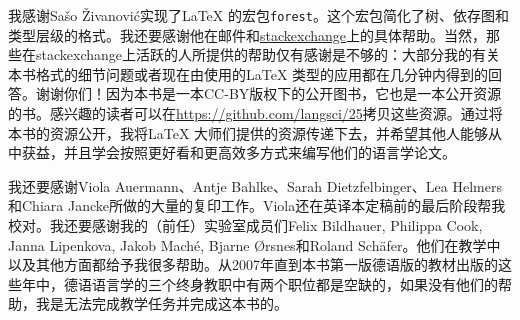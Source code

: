 我感谢Sašo Živanović实现了\LaTeX{} 的宏包\texttt{forest}。这个宏包简化了树、依存图和类型层级的格式。我还要感谢他在邮件和\href{http://www.stackexchange.com}{stackexchange}上的具体帮助。当然，那些在stackexchange上活跃的人所提供的帮助仅有感谢是不够的：大部分我的有关本书格式的细节问题或者现在由\lsp 使用的\LaTeX{} 类型的应用都在几分钟内得到的回答。谢谢你们！因为本书是一本CC-BY版权下的公开图书，它也是一本公开资源的书。感兴趣的读者可以在\url{https://github.com/langsci/25}拷贝这些资源。通过将本书的资源公开，我将\LaTeX{} 大师们提供的资源传递下去，并希望其他人能够从中获益，并且学会按照更好看和更高效多方式来编写他们的语言学论文。

我还要感谢Viola Auermann、Antje Bahlke、Sarah Dietzfelbinger、Lea Helmers和Chiara Jancke所做的大量的复印工作。Viola还在英译本定稿前的最后阶段帮我校对。我还要感谢我的（前任）实验室成员们Felix Bildhauer, Philippa Cook, Janna Lipenkova, Jakob Maché, Bjarne Ørsnes和Roland Schäfer。他们在教学中以及其他方面都给予我很多帮助。从2007年直到本书第一版德语版的教材出版的这些年中，德语语言学的三个终身教职中有两个职位都是空缺的，如果没有他们的帮助，我是无法完成教学任务并完成这本书的。


